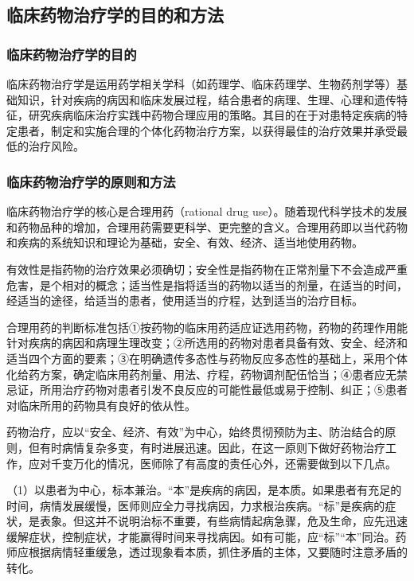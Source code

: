 \subsection{临床药物治疗学的目的和方法}

\subsubsection{临床药物治疗学的目的}

临床药物治疗学是运用药学相关学科（如药理学、临床药理学、生物药剂学等）基础知识，针对疾病的病因和临床发展过程，结合患者的病理、生理、心理和遗传特征，研究疾病临床治疗实践中药物合理应用的策略。其目的在于对患特定疾病的特定患者，制定和实施合理的个体化药物治疗方案，以获得最佳的治疗效果并承受最低的治疗风险。

\subsubsection{临床药物治疗学的原则和方法}

临床药物治疗学的核心是合理用药（rational drug
use）。随着现代科学技术的发展和药物品种的增加，合理用药需要更科学、更完整的含义。合理用药即以当代药物和疾病的系统知识和理论为基础，安全、有效、经济、适当地使用药物。

有效性是指药物的治疗效果必须确切；安全性是指药物在正常剂量下不会造成严重危害，是个相对的概念；适当性是指将适当的药物以适当的剂量，在适当的时间，经适当的途径，给适当的患者，使用适当的疗程，达到适当的治疗目标。

合理用药的判断标准包括①按药物的临床用药适应证选用药物，药物的药理作用能针对疾病的病因和病理生理改变；②所选用的药物对患者具备有效、安全、经济和适当四个方面的要素；③在明确遗传多态性与药物反应多态性的基础上，采用个体化给药方案，确定临床用药剂量、用法、疗程，药物调剂配伍恰当；④患者应无禁忌证，所用治疗药物对患者引发不良反应的可能性最低或易于控制、纠正；⑤患者对临床所用的药物具有良好的依从性。

药物治疗，应以``安全、经济、有效''为中心，始终贯彻预防为主、防治结合的原则，但有时病情复杂多变，有时进展迅速。因此，在这一原则下做好药物治疗工作，应对千变万化的情况，医师除了有高度的责任心外，还需要做到以下几点。

（1）以患者为中心，标本兼治。``本''是疾病的病因，是本质。如果患者有充足的时间，病情发展缓慢，医师则应全力寻找病因，力求根治疾病。``标''是疾病的症状，是表象。但这并不说明治标不重要，有些病情起病急骤，危及生命，应先迅速缓解症状，控制症状，才能赢得时间来寻找病因。如有可能，应``标''``本''同治。药师应根据病情轻重缓急，透过现象看本质，抓住矛盾的主体，又要随时注意矛盾的转化。

